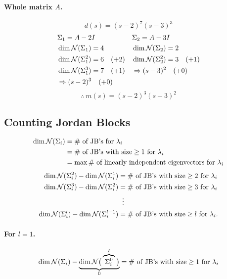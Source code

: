 \begin{example}
\paragraph{Whole matrix $A$.}
\[
d(s)=(s-2)^7(s-3)^3
\]
\begin{align*}
&\Sigma_1=A-2I & &\Sigma_2=A-3I\\
&\dim\mathcal{N}(\Sigma_1)=4 & &\dim\mathcal{N}(\Sigma_2)=2\\
&\dim\mathcal{N}(\Sigma_1^2)=6 \quad(+2) & &\dim\mathcal{N}(\Sigma_2^2)=3 \quad(+1)\\
&\dim\mathcal{N}(\Sigma_1^3)=7 \quad(+1) & &\Rightarrow (s-3)^2 \quad(+0)\\
&\Rightarrow (s-2)^3 \quad(+0)
\end{align*}
\[
\boxed{\therefore\ m(s)=(s-2)^{3}(s-3)^{2}}
\]
\end{example}

\subsection{Counting Jordan Blocks}\label{ss:counting-jb}
\begin{align*}
\dim\mathcal{N}(\Sigma_i)&=\#\text{ of JB's for }\lambda_i\\
&=\#\text{ of JB's with size}\ge1\text{ for }\lambda_i\\
&=\max\#\text{ of linearly independent eigenvectors for }\lambda_i
\end{align*}
\begin{align*}
\dim\mathcal{N}(\Sigma_i^2)-\dim\mathcal{N}(\Sigma_i^1)&=\#\text{ of JB's with size}\ge2\text{ for }\lambda_i\\
\dim\mathcal{N}(\Sigma_i^3)-\dim\mathcal{N}(\Sigma_i^2)&=\#\text{ of JB's with size}\ge3\text{ for }\lambda_i\\
&\;\;\vdots\\
\dim\mathcal{N}(\Sigma_i^{l})-\dim\mathcal{N}(\Sigma_i^{l-1})&=\#\text{ of JB's with size}\ge l\text{ for }\lambda_i.
\end{align*}
\paragraph{For $l=1$.}
\[
\dim\mathcal{N}(\Sigma_i)-\underbrace{\dim\mathcal{N}\big(\overbrace{\Sigma_i^0}^{I}\big)}_{0}=\#\text{ of JB's with size}\ge1\text{ for }\lambda_i
\]

